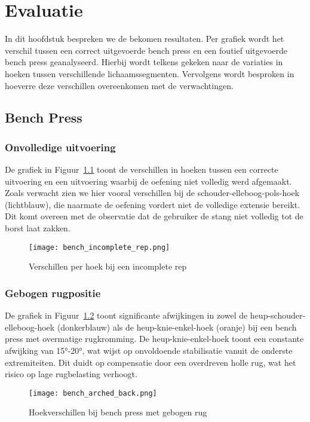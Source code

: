 \chapter{Evaluatie}
\label{ch:evaluatie}
In dit hoofdstuk bespreken we de bekomen resultaten. 
Per grafiek wordt het verschil tussen een correct uitgevoerde bench press en een foutief uitgevoerde bench press geanalyseerd. 
Hierbij wordt telkens gekeken naar de variaties in hoeken tussen verschillende lichaamssegmenten. 
Vervolgens wordt besproken in hoeverre deze verschillen overeenkomen met de verwachtingen.

\section{Bench Press}
\subsection{Onvolledige uitvoering}

De grafiek in Figuur~\ref{fig:incomplete_rep} toont de verschillen in hoeken tussen een correcte uitvoering en een uitvoering waarbij de oefening niet volledig werd afgemaakt. 
Zoals verwacht zien we hier vooral verschillen bij de schouder-elleboog-pols-hoek (lichtblauw), die naarmate de oefening vordert niet de volledige extensie bereikt. 
Dit komt overeen met de observatie dat de gebruiker de stang niet volledig tot de borst laat zakken.

\begin{figure}[h]
    \centering
    \texttt{[image: bench\_incomplete\_rep.png]}
    \caption{Verschillen per hoek bij een incomplete rep}
    \label{fig:incomplete_rep}
\end{figure}

\subsection{Gebogen rugpositie}

De grafiek in Figuur~\ref{fig:arched_back} toont significante afwijkingen in zowel de heup-schouder-elleboog-hoek (donkerblauw) als de heup-knie-enkel-hoek (oranje) bij een bench press met overmatige rugkromming. 
De heup-knie-enkel-hoek toont een constante afwijking van 15°-20°, wat wijst op onvoldoende stabilisatie vanuit de onderste extremiteiten. 
Dit duidt op compensatie door een overdreven holle rug, wat het risico op lage rugbelasting verhoogt.

\begin{figure}[h]
\centering
\texttt{[image: bench\_arched\_back.png]}
\caption{Hoekverschillen bij bench press met gebogen rug}
\label{fig:arched_back}
\end{figure}

